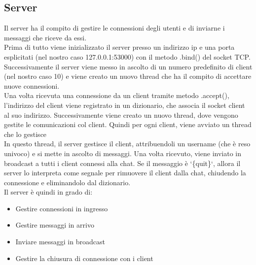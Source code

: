 \documentclass{article}
\begin{document}
\subsection{Server}
Il server ha il compito di gestire le connessioni degli utenti e di inviarne i messaggi che riceve da essi.\\
Prima di tutto viene inizializzato il server presso un indirizzo ip e una porta esplicitati (nel nostro caso 127.0.0.1:53000) con il metodo .bind() del socket TCP. Successivamente il server viene messo in ascolto di un numero predefinito di client (nel nostro caso 10) e viene creato un nuovo thread che ha il compito di accettare nuove connessioni.\\
Una volta ricevuta una connessione da un client tramite metodo .accept(), l'indirizzo del client viene registrato in un dizionario, che associa il socket client al suo indirizzo. Successivamente viene creato un nuovo thread, dove vengono gestite le comunicazioni col client. Quindi per ogni client, viene avviato un thread che lo gestisce\\
In questo thread, il server gestisce il client, attribuendoli un username (che è reso univoco) e si mette in ascolto di messaggi. Una volta ricevuto, viene inviato in broadcast a tutti i client connessi alla chat. Se il messaggio è `\{quit\}`, allora il server lo interpreta come segnale per rimuovere il client dalla chat, chiudendo la connessione e eliminandolo dal dizionario.\\
\newline
Il server è quindi in grado di:
\begin{itemize}
    \item Gestire connessioni in ingresso
    \item Gestire messaggi in arrivo
    \item Inviare messaggi in broadcast
    \item Gestire la chiusura di connessione con i client
\end{itemize}
\end{document}
